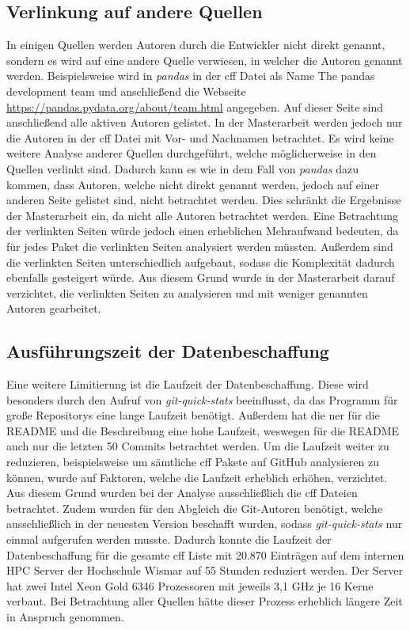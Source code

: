 \subsection*{Verlinkung auf andere Quellen}
\label{sec:verlinkung_auf_andere_quellen}
In einigen Quellen werden Autoren durch die Entwickler nicht direkt genannt, sondern es wird auf eine andere Quelle verwiesen, in welcher die Autoren genannt werden.
Beispielsweise wird in \emph{pandas} in der \gls{cff} Datei als Name \glqq The pandas development team\grqq{} und anschließend die Webseite \url{https://pandas.pydata.org/about/team.html} angegeben.
Auf dieser Seite sind anschließend alle aktiven Autoren gelistet.
In der Masterarbeit werden jedoch nur die Autoren in der \gls{cff} Datei mit Vor- und Nachnamen betrachtet.
Es wird keine weitere Analyse anderer Quellen durchgeführt, welche möglicherweise in den Quellen verlinkt sind.
Dadurch kann es wie in dem Fall von \emph{pandas} dazu kommen, dass Autoren, welche nicht direkt genannt werden, jedoch auf einer anderen Seite gelistet sind, nicht betrachtet werden.
Dies schränkt die Ergebnisse der Masterarbeit ein, da nicht alle Autoren betrachtet werden.
Eine Betrachtung der verlinkten Seiten würde jedoch einen erheblichen Mehraufwand bedeuten, da für jedes Paket die verlinkten Seiten analysiert werden müssten.
Außerdem sind die verlinkten Seiten unterschiedlich aufgebaut, sodass die Komplexität dadurch ebenfalls gesteigert würde.
Aus diesem Grund wurde in der Masterarbeit darauf verzichtet, die verlinkten Seiten zu analysieren und mit weniger genannten Autoren gearbeitet.

\subsection*{Ausführungszeit der Datenbeschaffung}
\label{sec:ausfuehrungszeit_der_datenbeschaffung}
Eine weitere Limitierung ist die Laufzeit der Datenbeschaffung.
Diese wird besonders durch den Aufruf von \emph{git-quick-stats} beeinflusst, da das Programm für große Repositorys eine lange Laufzeit benötigt.
Außerdem hat die \gls{ner} für die README und die Beschreibung eine hohe Laufzeit, weswegen für die README auch nur die letzten 50 Commits betrachtet werden.
Um die Laufzeit weiter zu reduzieren, beispielsweise um sämtliche \gls{cff} Pakete auf GitHub analysieren zu können, wurde auf Faktoren, welche die Laufzeit erheblich erhöhen, verzichtet.
Aus diesem Grund wurden bei der Analyse ausschließlich die \gls{cff} Dateien betrachtet.
Zudem wurden für den Abgleich die Git-Autoren benötigt, welche ausschließlich in der neuesten Version beschafft wurden, sodass \emph{git-quick-stats} nur einmal aufgerufen werden musste.
Dadurch konnte die Laufzeit der Datenbeschaffung für die gesamte \gls{cff} Liste mit 20.870 Einträgen auf dem internen HPC Server der Hochschule Wismar auf 55 Stunden reduziert werden.
Der Server hat zwei Intel Xeon Gold 6346 Prozessoren mit jeweils 3,1 GHz je 16 Kerne verbaut.
Bei Betrachtung aller Quellen hätte dieser Prozess erheblich längere Zeit in Anspruch genommen.

